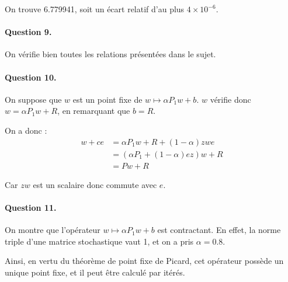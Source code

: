 \documentclass[12pt,a4paper]{article}
\begin{document}
On trouve 6.779941, soit un écart relatif d'au plus $4 \times 10^{-6}$.

\paragraph*{Question 9.}
On vérifie bien toutes les relations présentées dans le sujet.

\paragraph*{Question 10.}
On suppose que $w$ est un point fixe de $w \mapsto \alpha P_1 w + b$. $w$ vérifie donc $w = \alpha P_1 w + R$, en remarquant que $b = R$.

On a donc :
\begin{align*}
    w + c e &= \alpha P_1 w + R + (1 - \alpha) z w e\\
    &= (\alpha P_1 + (1 - \alpha) e z)w + R \\
    &= P w + R
\end{align*}

Car $zw$ est un scalaire donc commute avec $e$.

\paragraph*{Question 11.}
On montre que l'opérateur $w \mapsto \alpha P_1 w + b$ est contractant. En effet, la norme triple d'une matrice stochastique vaut 1, et on a pris $\alpha = 0.8$.

Ainsi, en vertu du théorème de point fixe de Picard, cet opérateur possède un unique point fixe, et il peut être calculé par itérés.
\end{document}
